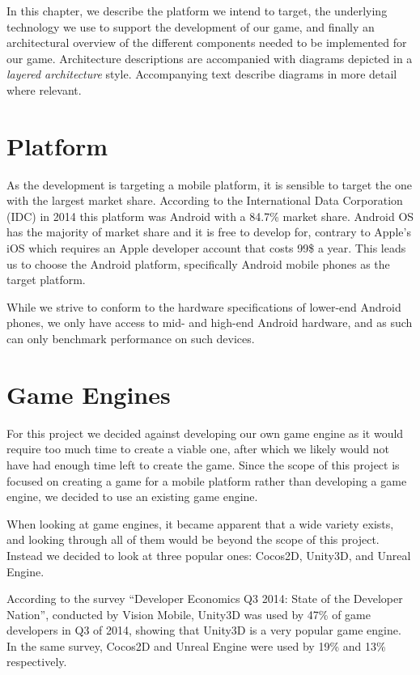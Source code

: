 In this chapter, we describe the platform we intend to target, the underlying
technology we use to support the development of our game, and finally an
architectural overview of the different components needed to be implemented for
our game. Architecture descriptions are accompanied with diagrams depicted in a
\textit{layered architecture} style. Accompanying text describe diagrams in
more detail where relevant.

\section{Platform} 
As the development is targeting a mobile platform, it is sensible to target the one with the largest market share.
According to the International Data Corporation (IDC) in 2014 this platform was Android with a 84.7\% market share\cite{marketshare}.
Android OS has the majority of market share and it is free to develop
for, contrary to Apple's iOS which requires an Apple developer account that
costs 99\$ a year\cite{appledevprogram}.
This leads us to choose the Android platform, specifically Android mobile
phones as the target platform.

While we strive to conform to the hardware specifications of lower-end Android
phones, we only have access to mid- and high-end Android hardware, and as such
can only benchmark performance on such devices.

\section{Game Engines}
For this project we decided against developing our own game engine as it would require too much time to create a viable one, after which we likely would not have had enough time left to create the game. 
Since the scope of this project is focused on creating a game for a mobile platform rather than developing a game engine, we decided to use an existing game engine.

When looking at game engines, it became apparent that a wide variety exists, and looking through all of them would be beyond the scope of this project.
Instead we decided to look at three popular ones: Cocos2D, Unity3D, and Unreal Engine.

According to the survey ``Developer Economics Q3 2014: State of the Developer Nation''\cite{visionmobile-survey}, conducted by Vision Mobile\cite{visionmobile}, Unity3D was used by 47\% of game developers in Q3 of 2014, showing that Unity3D is a very popular game engine. 
In the same survey, Cocos2D and Unreal Engine were used by 19\% and 13\% respectively.

